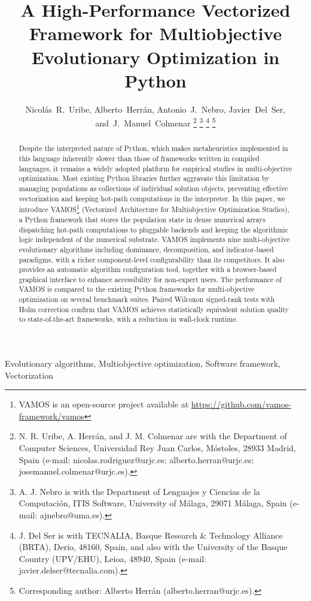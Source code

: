 \documentclass[journal]{IEEEtran}
\title{A High-Performance Vectorized Framework for Multiobjective Evolutionary Optimization in Python}
\author{Nicol\'{a}s~R.~Uribe,
        Alberto~Herr\'{a}n,
        Antonio~J.~Nebro,
        Javier~Del~Ser,
        and~J.~Manuel~Colmenar%
\thanks{N. R. Uribe, A. Herr\'{a}n, and J. M. Colmenar are with the
  Department of Computer Sciences, Universidad Rey Juan Carlos, M\'{o}stoles,
  28933 Madrid, Spain (e-mail: nicolas.rodriguez@urjc.es; alberto.herran@urjc.es;
  josemanuel.colmenar@urjc.es).}%
\thanks{A. J. Nebro is with the Department of Lenguajes y Ciencias de la
  Computaci\'{o}n, ITIS Software, University of M\'{a}laga, 29071
  M\'{a}laga, Spain (e-mail: ajnebro@uma.es).}%
\thanks{J. Del Ser is with TECNALIA, Basque Research \& Technology
  Alliance (BRTA), Derio, 48160, Spain, and also with the University
  of the Basque Country (UPV/EHU), Leioa, 48940, Spain (e-mail: javier.delser@tecnalia.com).}%
\thanks{Corresponding author: Alberto Herr\'{a}n (alberto.herran@urjc.es).}%
}
\begin{document}
\maketitle

\begin{abstract}
Despite the interpreted nature of Python, which makes metaheuristics implemented in this language inherently slower than those of frameworks written in compiled languages, it remains a widely adopted platform for empirical studies in multi-objective optimization. Most existing Python libraries further aggravate this limitation by managing populations as collections of individual solution objects, preventing effective vectorization and keeping hot-path computations in the interpreter. In this paper, we introduce VAMOS\footnote{VAMOS is an open-source project available at \url{https://github.com/vamos-framework/vamos}} (Vectorized Architecture for Multiobjective Optimization Studies), a Python framework that stores the population state in dense numerical arrays dispatching hot-path computations to pluggable backends and keeping the algorithmic logic independent of the numerical substrate. VAMOS implements nine multi-objective evolutionary algorithms including dominance, decomposition, and indicator-based paradigms, with a richer component-level configurability than its competitors. It also provides an automatic algorithm configuration tool, together with a
browser-based graphical interface to enhance accessibility for non-expert users. The performance of VAMOS is compared to the existing Python frameworks for multi-objective optimization on several benchmark suites. Paired Wilcoxon signed-rank tests with Holm correction confirm that VAMOS achieves statistically equivalent solution quality to state-of-the-art frameworks, with a reduction in wall-clock runtime.
\end{abstract}

\begin{IEEEkeywords}
Evolutionary algorithms, Multiobjective optimization, Software framework, Vectorization
\end{IEEEkeywords}

\IEEEpeerreviewmaketitle
\end{document}
